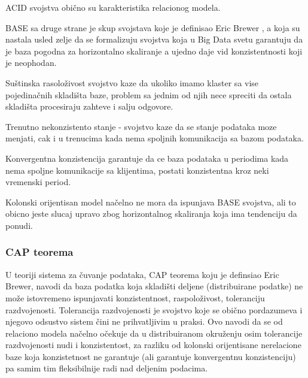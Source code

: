 \documentclass[12pt,oneside]{memoir}
\begin{document}
ACID svojstva obično su karakteristika relacionog modela.

BASE sa druge strane je skup svojstava koje je definisao Eric Brewer , a koja su nastala usled zelje da se formalizuju svojstva koja u Big Data svetu garantuju da je baza pogodna za horizontalno skaliranje a ujedno daje vid konzistentnosti koji je neophodan. 

Suštinska rasoloživost  svojstvo kaze da ukoliko imamo klaster sa vise pojedinačnih skladišta baze, problem sa jednim od njih nece spreciti da ostala skladišta procesiraju zahteve i salju odgovore.

Trenutno nekonzistento stanje -  svojstvo kaze da se stanje podataka moze menjati, cak i u trenucima kada nema spoljnih komunikacija sa bazom podataka.

Konvergentna konzistencija garantuje da ce baza podataka u periodima kada nema spoljne komunikacije sa klijentima, postati konzistentna kroz neki vremenski period. 

Kolonski orijentisan model načelno ne mora da ispunjava BASE svojstva, ali to obicno jeste slucaj upravo zbog horizontalnog skaliranja koja ima tendenciju da ponudi.

\subsubsection{CAP teorema}

U teoriji sistema za čuvanje podataka, CAP teorema koju je definsiao Eric Brewer, navodi da baza podatka koja skladišti deljene (distribuirane podatke) ne može istovremeno ispunjavati konzistentnost, raspoloživost, toleranciju razdvojenosti.
Tolerancija razdvojenosti je svojstvo koje se obično pordazumeva i njegovo odsustvo sistem čini ne prihvatljivim u praksi. Ovo navodi da se od relaciono modela načelno očekuje da u distribuiranom okruženju osim tolerancije razdvojenosti nudi i konzistentost, za razliku od kolonski orijentisane nerelacione baze koja konzistetnost ne garantuje (ali garantuje konvergentnu konzistenciju) pa samim tim fleksibilnije radi nad deljenim podacima.
\end{document}
